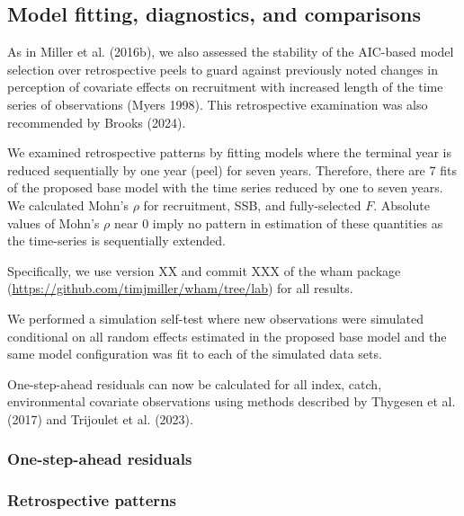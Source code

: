 \documentclass[
]{article}
\begin{document}
\hypertarget{model-fitting-diagnostics-and-comparisons}{%
\subsection*{Model fitting, diagnostics, and
comparisons}\label{model-fitting-diagnostics-and-comparisons}}

As in Miller et al. (2016b), we also assessed the stability of the
AIC-based model selection over retrospective peels to guard against
previously noted changes in perception of covariate effects on
recruitment with increased length of the time series of observations
(Myers 1998). This retrospective examination was also recommended by
Brooks (2024).

We examined retrospective patterns by fitting models where the terminal
year is reduced sequentially by one year (peel) for seven years.
Therefore, there are 7 fits of the proposed base model with the time
series reduced by one to seven years. We calculated Mohn's \(\rho\) for
recruitment, SSB, and fully-selected \(F\). Absolute values of Mohn's
\(\rho\) near 0 imply no pattern in estimation of these quantities as
the time-series is sequentially extended.

Specifically, we use version XX and commit XXX of the wham package
(\url{https://github.com/timjmiller/wham/tree/lab}) for all results.

We performed a simulation self-test where new observations were
simulated conditional on all random effects estimated in the proposed
base model and the same model configuration was fit to each of the
simulated data sets.

One-step-ahead residuals can now be calculated for all index, catch,
environmental covariate observations using methods described by Thygesen
et al. (2017) and Trijoulet et al. (2023).

\hypertarget{one-step-ahead-residuals}{%
\subsubsection*{One-step-ahead
residuals}\label{one-step-ahead-residuals}}

\hypertarget{retrospective-patterns}{%
\subsubsection*{Retrospective patterns}\label{retrospective-patterns}}
\end{document}
